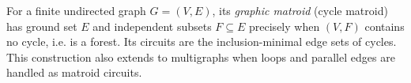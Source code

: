 
For a finite undirected graph $G=(V,E)$, its \emph{graphic matroid} (cycle matroid) has ground set $E$ and independent subsets $F\subseteq E$ precisely when $(V,F)$ contains no cycle, i.e. is a forest. Its circuits are the inclusion-minimal edge sets of cycles. This construction also extends to multigraphs when loops and parallel edges are handled as matroid circuits.
